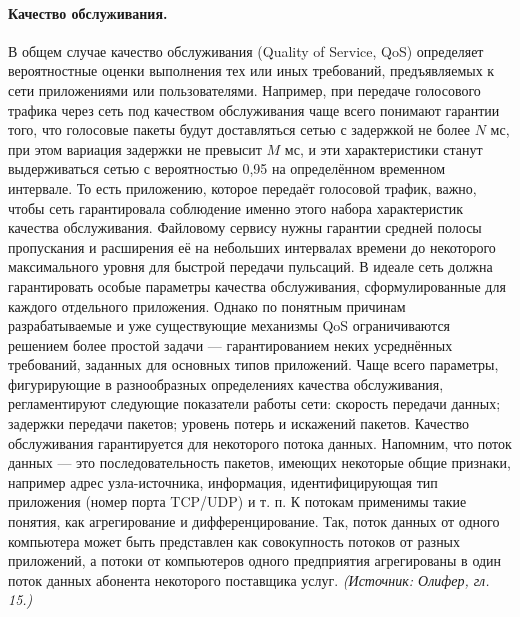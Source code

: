 \documentclass[a4paper,12pt]{article}
\begin{document}
\paragraph{Качество обслуживания.}
В общем случае качество обслуживания (Quality of Service, QoS) определяет вероятностные оценки выполнения тех или иных требований, предъявляемых к сети приложениями или пользователями. Например, при передаче голосового трафика через сеть под качеством обслуживания чаще всего понимают гарантии того, что голосовые пакеты будут доставляться сетью с задержкой не более \(N\) мс, при этом вариация задержки не превысит \(M\) мс, и эти характеристики станут выдерживаться сетью с вероятностью 0,95 на определённом временном интервале. То есть приложению, которое передаёт голосовой трафик, важно, чтобы сеть гарантировала соблюдение именно этого набора характеристик качества обслуживания. Файловому сервису нужны гарантии средней полосы пропускания и расширения её на небольших интервалах времени до некоторого максимального уровня для быстрой передачи пульсаций. В идеале сеть должна гарантировать особые параметры качества обслуживания, сформулированные для каждого отдельного приложения. Однако по понятным причинам разрабатываемые и уже существующие механизмы QoS ограничиваются решением более простой задачи — гарантированием неких усреднённых требований, заданных для основных типов приложений. Чаще всего параметры, фигурирующие в разнообразных определениях качества обслуживания, регламентируют следующие показатели работы сети: скорость передачи данных; задержки передачи пакетов; уровень потерь и искажений пакетов. Качество обслуживания гарантируется для некоторого потока данных. Напомним, что поток данных — это последовательность пакетов, имеющих некоторые общие признаки, например адрес узла-источника, информация, идентифицирующая тип приложения (номер порта TCP/UDP) и т. п. К потокам применимы такие понятия, как агрегирование и дифференцирование. Так, поток данных от одного компьютера может быть представлен как совокупность потоков от разных приложений, а потоки от компьютеров одного предприятия агрегированы в один поток данных абонента некоторого поставщика услуг.
\textit{(Источник: Олифер, гл. 15.)}
\end{document}
